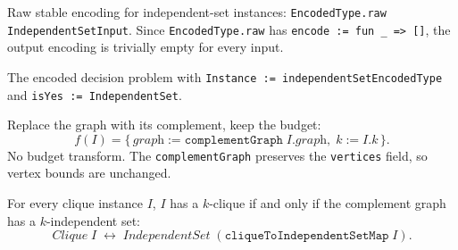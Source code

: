 \begin{definition}
  \label{def:independent_set_encoded_type}
  Raw stable encoding for independent-set instances:
  \texttt{EncodedType.raw IndependentSetInput}. Since
  \texttt{EncodedType.raw} has \texttt{encode := fun \_ => []}, the
  output encoding is trivially empty for every input.
\end{definition}

\begin{definition}
  \label{def:independent_set_decision_problem}
  The encoded decision problem with
  \texttt{Instance := independentSetEncodedType} and
  \texttt{isYes := IndependentSet}.
\end{definition}

\begin{definition}
  \label{def:clique_to_independent_set_map}
  Replace the graph with its complement, keep the budget:
  \[
    f(I) = \{\, \textit{graph} := \texttt{complementGraph}\;I.\textit{graph},\;
    k := I.k \,\}.
  \]
  No budget transform. The \texttt{complementGraph} preserves the
  \texttt{vertices} field, so vertex bounds are unchanged.
\end{definition}

\begin{theorem}
  \label{thm:clique_to_independent_set_correct}
  For every clique instance $I$, $I$ has a $k$-clique if and only if
  the complement graph has a $k$-independent set:
  \[
    \textit{Clique}\;I \;\leftrightarrow\;
    \textit{IndependentSet}\;(\texttt{cliqueToIndependentSetMap}\;I).
  \]
\end{theorem}

